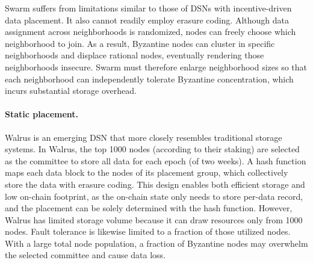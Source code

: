 Swarm suffers from limitations similar to those of DSNs with incentive-driven data placement.
It also cannot readily employ erasure coding.
Although data assignment across neighborhoods is randomized, nodes can freely choose which neighborhood to join.
As a result, Byzantine nodes can cluster in specific neighborhoods and displace rational nodes, eventually rendering those neighborhoods insecure.
Swarm must therefore enlarge neighborhood sizes so that each neighborhood can independently tolerate Byzantine concentration, which incurs substantial storage overhead.

\paragraph{Static placement.}
Walrus is an emerging DSN that more closely resembles traditional storage systems.
In Walrus, the top 1000 nodes (according to their staking) are selected as the committee to store all data for each epoch (of two weeks).
A hash function maps each data block to the nodes of its placement group, which collectively store the data with erasure coding.
This design enables both efficient storage and low on-chain footprint, as the on-chain state only needs to store per-data record, and the placement can be solely determined with the hash function.
However, Walrus has limited storage volume because it can draw resources only from 1000 nodes.
Fault tolerance is likewise limited to a fraction of those utilized nodes.
With a large total node population, a fraction of Byzantine nodes may overwhelm the selected committee and cause data loss.
\fi